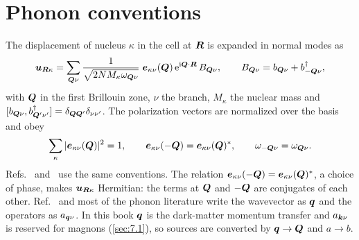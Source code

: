 \section{Phonon conventions}\label{app:A.6}

The displacement of nucleus $\kappa$ in the cell at $\bm{R}$ is expanded in normal modes as
\begin{equation}
  \bm{u}_{\bm{R}\kappa} = \sum_{\bm{Q}\nu}\frac{1}{\sqrt{2NM_\kappa\omega_{\bm{Q}\nu}}}\;\bm{e}_{\kappa\nu}(\bm{Q})\,\mathrm{e}^{\mathrm{i}\bm{Q}\cdot\bm{R}}\,B_{\bm{Q}\nu},
  \qquad B_{\bm{Q}\nu} = b_{\bm{Q}\nu} + b^\dagger_{-\bm{Q}\nu},
  \label{eq:A.6-u}
\end{equation}
with $\bm{Q}$ in the first Brillouin zone, $\nu$ the branch, $M_\kappa$ the nuclear mass and $[b_{\bm{Q}\nu}, b^\dagger_{\bm{Q}'\nu'}] = \delta_{\bm{Q}\bm{Q}'}\delta_{\nu\nu'}$. The polarization vectors are normalized over the basis and obey
\begin{equation}
  \sum_\kappa|\bm{e}_{\kappa\nu}(\bm{Q})|^2 = 1, \qquad \bm{e}_{\kappa\nu}(-\bm{Q}) = \bm{e}_{\kappa\nu}(\bm{Q})^*, \qquad \omega_{-\bm{Q}\nu} = \omega_{\bm{Q}\nu}.
  \label{eq:A.6-e}
\end{equation}
Refs.~\cite[Eqs.~(16)--(18)]{giustino2017electron} and~\cite[Eq.~(29)]{trickle2022effective} use the same conventions. The relation $\bm{e}_{\kappa\nu}(-\bm{Q}) = \bm{e}_{\kappa\nu}(\bm{Q})^*$, a choice of phase, makes $\bm{u}_{\bm{R}\kappa}$ Hermitian: the terms at $\bm{Q}$ and $-\bm{Q}$ are conjugates of each other. Ref.~\cite{giustino2017electron} and most of the phonon literature write the wavevector as $\bm{q}$ and the operators as $a_{\bm{q}\nu}$. In this book $\bm{q}$ is the dark-matter momentum transfer and $a_{\bm{k}\nu}$ is reserved for magnons (\cref{sec:7.1}), so sources are converted by $\bm{q} \to \bm{Q}$ and $a \to b$.

